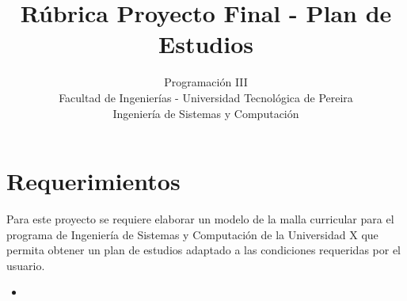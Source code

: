 \documentclass{article}
\title{Rúbrica Proyecto Final - Plan de Estudios}
\author{Programación III \\ Facultad de Ingenierías - Universidad Tecnológica de Pereira \\ Ingeniería de Sistemas y Computación}
\date{}
\begin{document}
\maketitle
\thispagestyle{empty}

\section{Requerimientos}

Para este proyecto se requiere elaborar un modelo de la malla curricular para el programa de Ingeniería de Sistemas y Computación de la Universidad X que permita obtener un plan de estudios adaptado a las condiciones requeridas por el usuario.
\begin{itemize}
    \item 
\end{itemize}
\end{document}
